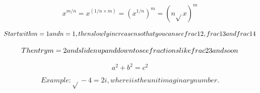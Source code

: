 \[x^{m/n} = x^{(1/n \times m)} = (x^{1/n})^{m} = (n\sqrt{}x )^{m}\]

\[Start with m=1 and n=1, then slowly increase n so that you can see \\frac{1}{2}, \\frac{1}{3} and \\frac{1}{4}\]

\[Then try m=2 and slide n up and down to see fractions like \\frac{2}{3} and so on\]

\[a^{2} + b^{2} = c^{2}\]

\[Example: \sqrt{}-4 = 2i, where i is the unit imaginary number.\]

